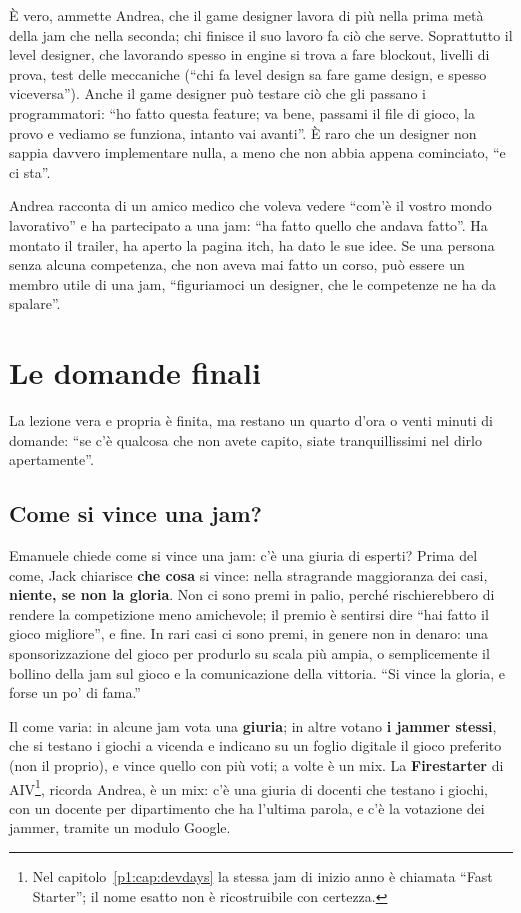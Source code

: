 È vero, ammette Andrea, che il game designer lavora di più nella prima metà
della jam che nella seconda; chi finisce il suo lavoro fa ciò che serve.
Soprattutto il level designer, che lavorando spesso in engine si trova a fare
blockout, livelli di prova, test delle meccaniche (``chi fa level design sa
fare game design, e spesso viceversa''). Anche il game designer può testare
ciò che gli passano i programmatori: ``ho fatto questa feature; va bene,
passami il file di gioco, la provo e vediamo se funziona, intanto vai
avanti''. È raro che un designer non sappia davvero implementare nulla, a
meno che non abbia appena cominciato, ``e ci sta''.

Andrea racconta di un amico medico che voleva vedere ``com'è il vostro mondo
lavorativo'' e ha partecipato a una jam: ``ha fatto quello che andava
fatto''. Ha montato il trailer, ha aperto la pagina itch, ha dato le sue
idee. Se una persona senza alcuna competenza, che non aveva mai fatto un
corso, può essere un membro utile di una jam, ``figuriamoci un designer, che
le competenze ne ha da spalare''.

\section{Le domande finali}
\label{p2:sec:domande}

La lezione vera e propria è finita, ma restano un quarto d'ora o venti
minuti di domande: ``se c'è qualcosa che non avete capito, siate
tranquillissimi nel dirlo apertamente''.

\subsection{Come si vince una jam?}

Emanuele chiede come si vince una jam: c'è una giuria di esperti? Prima del
come, Jack chiarisce \textbf{che cosa} si vince: nella stragrande maggioranza
dei casi, \textbf{niente, se non la gloria}. Non ci sono premi in palio,
perché rischierebbero di rendere la competizione meno amichevole; il premio
è sentirsi dire ``hai fatto il gioco migliore'', e fine. In rari casi ci sono
premi, in genere non in denaro: una sponsorizzazione del gioco per
produrlo su scala più ampia, o semplicemente il bollino della jam sul gioco
e la comunicazione della vittoria. ``Si vince la gloria, e forse un po' di
fama.''

Il come varia: in alcune jam vota una \textbf{giuria}; in altre votano
\textbf{i jammer stessi}, che si testano i giochi a vicenda e indicano su un
foglio digitale il gioco preferito (non il proprio), e vince quello con più
voti; a volte è un mix. La \textbf{Firestarter} di AIV\footnote{Nel
capitolo~\ref{p1:cap:devdays} la stessa jam di inizio anno è chiamata
``Fast Starter''; il nome esatto non è ricostruibile con certezza.}, ricorda
Andrea, è un mix: c'è una giuria di docenti che testano i giochi, con un
docente per dipartimento che ha l'ultima parola, e c'è la votazione dei
jammer, tramite un modulo Google.

